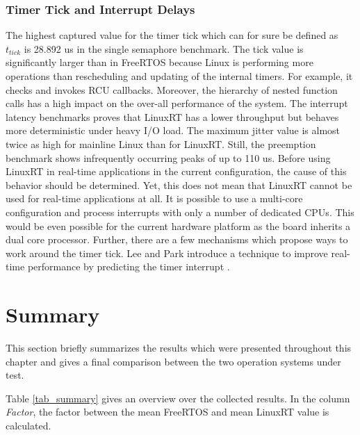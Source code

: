 \subsubsection{Timer Tick and Interrupt Delays}
The highest captured value for the timer tick which can for sure be defined as $t_{tick}$ is 28.892 us in the single semaphore benchmark.
The tick value is significantly larger than in FreeRTOS because Linux is performing more operations than rescheduling and updating of the internal timers. 
For example, it checks and invokes \ac{RCU} callbacks.
Moreover, the hierarchy of nested function calls has a high impact on the over-all performance of the system. 
The interrupt latency benchmarks proves that LinuxRT has a lower throughput but behaves more deterministic under heavy \ac{I/O} load. 
The maximum jitter value is almost twice as high for mainline Linux than for LinuxRT.
Still, the preemption benchmark shows infrequently occurring peaks of up to 110 us. 
Before using LinuxRT in real-time applications in the current configuration, the cause of this behavior should be determined.
Yet, this does not mean that LinuxRT cannot be used for real-time applications at all.
It is possible to use a multi-core configuration and process interrupts with only a number of dedicated \acp{CPU}.
This would be even possible for the current hardware platform as the board inherits a dual core processor.
Further, there are a few mechanisms which propose ways to work around the timer tick.
Lee and Park introduce a technique to improve real-time performance by predicting the timer interrupt \cite{lee:dltfirtpoelbpoti}.

\section{Summary}
This section briefly summarizes the results which were presented throughout this chapter and gives a final comparison between the two operation systems under test.
\par
Table \ref{tab_summary} gives an overview over the collected results.
In the column \textit{Factor}, the factor between the mean FreeRTOS and mean LinuxRT value is calculated. 

